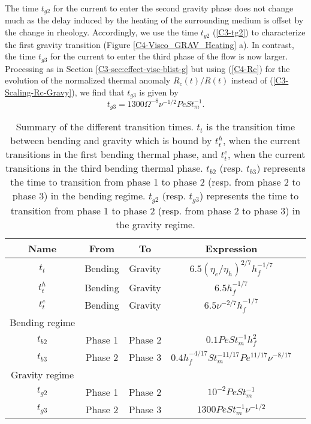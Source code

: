 The time  $t_{g2}$ for the current  to enter the second  gravity phase
does  not change  much as  the  delay induced  by the  heating of  the
surrounding medium is offset by  the change in rheology.  Accordingly,
we  use the  time $t_{g2}$  (\ref{C3-tg2}) to  characterize the  first
gravity   transition  (Figure   \ref{C4-Visco_GRAV_Heating}  a).    In
contrast, the time  $t_{g3}$ for the current to enter  the third phase
of   the   flow   is   now   larger.    Processing   as   in   Section
\ref{C3-sec:effect-visc-blist-g}  but  using   (\ref{C4-Rc})  for  the
evolution of  the normalized thermal anomaly  $R_c(t)/R(t)$ instead of
(\ref{C3-Scaling-Rc-Gravy}), we find that $t_{g3}$ is given by
\begin{equation}
  t_{g3}= 1300 \Omega^{-8}\nu^{-1/2}Pe St_m^{-1}.
  \label{C4-tg3}
\end{equation}

\begin{table}[h!]
  \begin{center}
    \begin{tabular}{c|cc|cc}
      Name&From&To&Expression\\
      \hline
      $t_t$&Bending&Gravity&$6.5(\eta_e/\eta_h)^{2/7}h_f^{-1/7}$\\
      $t_t^h$&Bending&Gravity&$6.5h_f^{-1/7}$\\
      $t_t^c$&Bending&Gravity&$6.5\nu^{-2/7}h_f^{-1/7}$\\
      Bending regime&\multicolumn{2}{c}{}& \\
      $t_{b2}$&Phase 1& Phase 2&$0.1 Pe St_m^{-1} h_f^2$\\
      $t_{b3}$&Phase 2& Phase 3 &$0.4 h_f^{-4/17} St_m^{-11/17}Pe^{11/17}\nu^{-8/17}$\\
      Gravity regime&\multicolumn{3}{c}{} \\
      $t_{g2}$ &Phase 1& Phase 2 &$10^{-2}PeSt_m^{-1}$\\
      $t_{g3}$ &Phase 2& Phase 3 &$ 1300Pe St_m^{-1}\nu^{-1/2}$\\
    \end{tabular}
    \caption{Summary of the different  transition times.  $t_t$ is the
      transition time  between bending and  gravity which is  bound by
      $t_t^h$,  when  the current  transitions  in  the first  bending
      thermal phase, and $t_t^c$, when  the current transitions in the
      third  bending   thermal  phase.   $t_{b2}$   (resp.   $t_{b3}$)
      represents  the time  to  transition  from phase  1  to phase  2
      (resp. from phase 2 to phase  3) in the bending regime. $t_{g2}$
      (resp. $t_{g3}$) represents the time  to transition from phase 1
      to  phase 2  (resp. from  phase  2 to  phase 3)  in the  gravity
      regime. }
    \label{tab:TimeTransition}
  \end{center}
\end{table}
